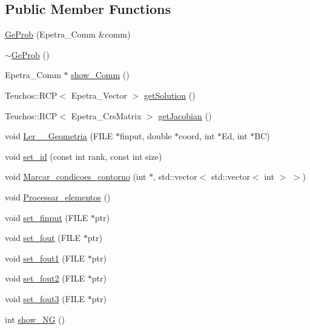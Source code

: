 \subsection*{Public Member Functions}
\begin{DoxyCompactItemize}
\item 
\hyperlink{classGeProb_ac03bca1cdd6f679175a861b3b8145e55}{Ge\+Prob} (Epetra\+\_\+\+Comm \&comm)
\item 
\hyperlink{classGeProb_ab4bb730d1218feabfd8b1d8e8c0130aa}{$\sim$\+Ge\+Prob} ()
\item 
Epetra\+\_\+\+Comm $\ast$ \hyperlink{classGeProb_a810c17dc99110efbb57b8ad28adc5cb7}{show\+\_\+\+Comm} ()
\item 
Teuchos\+::\+R\+CP$<$ Epetra\+\_\+\+Vector $>$ \hyperlink{classGeProb_ae29860923e40758aa1a7810556bb0f8e}{get\+Solution} ()
\item 
Teuchos\+::\+R\+CP$<$ Epetra\+\_\+\+Crs\+Matrix $>$ \hyperlink{classGeProb_a5c8159fd807c26eaec5c0a9fa72636f6}{get\+Jacobian} ()
\item 
void \hyperlink{classGeProb_a1b1545b917023458df409bd97573bac5}{Ler\+\_\+\+\_\+\+Geometria} (F\+I\+LE $\ast$finput, double $\ast$coord, int $\ast$Ed, int $\ast$BC)
\item 
void \hyperlink{classGeProb_ae922c4a2ec2974c44cbcfa02e56855db}{set\+\_\+id} (const int rank, const int size)
\item 
void \hyperlink{classGeProb_a6fc2ba08f7556408bd9082ed34ada7bd}{Marcar\+\_\+condicoes\+\_\+contorno} (int $\ast$, std\+::vector$<$ std\+::vector$<$ int $>$ $>$)
\item 
void \hyperlink{classGeProb_abe608186b9102498672c115584169d9a}{Processar\+\_\+elementos} ()
\item 
void \hyperlink{classGeProb_adc17f3e57dab093882ec7f7aebea634f}{set\+\_\+finput} (F\+I\+LE $\ast$ptr)
\item 
void \hyperlink{classGeProb_adba307125006b1f5e0bd9a04e05cecf2}{set\+\_\+fout} (F\+I\+LE $\ast$ptr)
\item 
void \hyperlink{classGeProb_a75433e7f3aec6d8f0746cd3e0e82db96}{set\+\_\+fout1} (F\+I\+LE $\ast$ptr)
\item 
void \hyperlink{classGeProb_a18762ac0ce4ba659b15e97a5521bc456}{set\+\_\+fout2} (F\+I\+LE $\ast$ptr)
\item 
void \hyperlink{classGeProb_a2fa255c26250f6ee540b910949f530ed}{set\+\_\+fout3} (F\+I\+LE $\ast$ptr)
\item 
int \hyperlink{classGeProb_a2f37b74c21a3bdc3fc112babc8a0123b}{show\+\_\+\+NG} ()

\end{DoxyCompactItemize}
